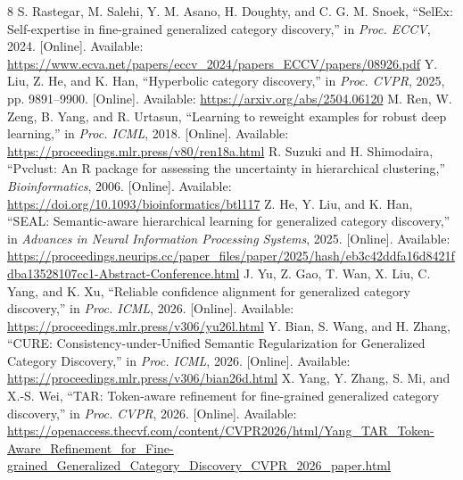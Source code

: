 \documentclass[conference]{IEEEtran}
\begin{document}
\begin{thebibliography}{8}
 S. Rastegar, M. Salehi, Y. M. Asano, H. Doughty, and C. G. M. Snoek, ``SelEx: Self-expertise in fine-grained generalized category discovery,'' in \emph{Proc. ECCV}, 2024. [Online]. Available: \url{https://www.ecva.net/papers/eccv_2024/papers_ECCV/papers/08926.pdf}
 Y. Liu, Z. He, and K. Han, ``Hyperbolic category discovery,'' in \emph{Proc. CVPR}, 2025, pp. 9891--9900. [Online]. Available: \url{https://arxiv.org/abs/2504.06120}
 M. Ren, W. Zeng, B. Yang, and R. Urtasun, ``Learning to reweight examples for robust deep learning,'' in \emph{Proc. ICML}, 2018. [Online]. Available: \url{https://proceedings.mlr.press/v80/ren18a.html}
 R. Suzuki and H. Shimodaira, ``Pvclust: An R package for assessing the uncertainty in hierarchical clustering,'' \emph{Bioinformatics}, 2006. [Online]. Available: \url{https://doi.org/10.1093/bioinformatics/btl117}
 Z. He, Y. Liu, and K. Han, ``SEAL: Semantic-aware hierarchical learning for generalized category discovery,'' in \emph{Advances in Neural Information Processing Systems}, 2025. [Online]. Available: \url{https://proceedings.neurips.cc/paper_files/paper/2025/hash/eb3c42ddfa16d8421fdba13528107cc1-Abstract-Conference.html}
 J. Yu, Z. Gao, T. Wan, X. Liu, C. Yang, and K. Xu, ``Reliable confidence alignment for generalized category discovery,'' in \emph{Proc. ICML}, 2026. [Online]. Available: \url{https://proceedings.mlr.press/v306/yu26l.html}
 Y. Bian, S. Wang, and H. Zhang, ``CURE: Consistency-under-Unified Semantic Regularization for Generalized Category Discovery,'' in \emph{Proc. ICML}, 2026. [Online]. Available: \url{https://proceedings.mlr.press/v306/bian26d.html}
 X. Yang, Y. Zhang, S. Mi, and X.-S. Wei, ``TAR: Token-aware refinement for fine-grained generalized category discovery,'' in \emph{Proc. CVPR}, 2026. [Online]. Available: \url{https://openaccess.thecvf.com/content/CVPR2026/html/Yang_TAR_Token-Aware_Refinement_for_Fine-grained_Generalized_Category_Discovery_CVPR_2026_paper.html}
\end{thebibliography}
\end{document}
